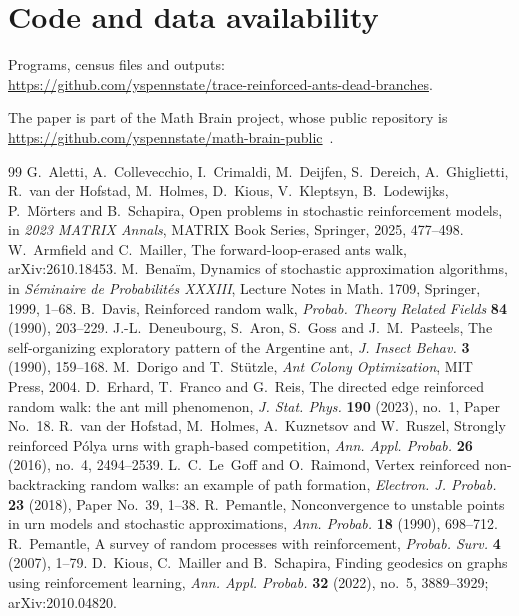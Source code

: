 \documentclass[11pt]{amsart}
\theoremstyle{remark}
\begin{document}
\section*{Code and data availability}
Programs, census files and outputs:\\
\url{https://github.com/yspennstate/trace-reinforced-ants-dead-branches}.

The paper is part of the Math Brain project, whose public repository is
\url{https://github.com/yspennstate/math-brain-public}~\cite{MathBrainRepo}.

\begin{thebibliography}{99}
 G.~Aletti, A.~Collevecchio, I.~Crimaldi, M.~Deijfen, S.~Dereich, A.~Ghiglietti, R.~van der Hofstad,
M.~Holmes, D.~Kious, V.~Kleptsyn, B.~Lodewijks, P.~M\"orters and B.~Schapira, Open problems in stochastic
reinforcement models, in \emph{2023 MATRIX Annals}, MATRIX Book Series, Springer, 2025, 477--498.
 W.~Armfield and C.~Mailler, The forward-loop-erased ants walk, arXiv:2610.18453.
 M.~Bena\"im, Dynamics of stochastic approximation algorithms, in \emph{S\'eminaire de Probabilit\'es
XXXIII}, Lecture Notes in Math. 1709, Springer, 1999, 1--68.
 B.~Davis, Reinforced random walk, \emph{Probab. Theory Related Fields} \textbf{84} (1990), 203--229.
 J.-L.~Deneubourg, S.~Aron, S.~Goss and J.~M.~Pasteels, The self-organizing exploratory pattern of the
Argentine ant, \emph{J. Insect Behav.} \textbf{3} (1990), 159--168.
 M.~Dorigo and T.~St\"utzle, \emph{Ant Colony Optimization}, MIT Press, 2004.
 D.~Erhard, T.~Franco and G.~Reis, The directed edge reinforced random walk: the ant mill phenomenon,
\emph{J. Stat. Phys.} \textbf{190} (2023), no.~1, Paper No.~18.
 R.~van der Hofstad, M.~Holmes, A.~Kuznetsov and W.~Ruszel, Strongly reinforced P\'olya urns with
graph-based competition, \emph{Ann. Appl. Probab.} \textbf{26} (2016), no.~4, 2494--2539.
 L.~C.~Le~Goff and O.~Raimond, Vertex reinforced non-backtracking random walks: an example of path
formation, \emph{Electron. J. Probab.} \textbf{23} (2018), Paper No.~39, 1--38.
 R.~Pemantle, Nonconvergence to unstable points in urn models and stochastic approximations,
\emph{Ann. Probab.} \textbf{18} (1990), 698--712.
 R.~Pemantle, A survey of random processes with reinforcement, \emph{Probab. Surv.} \textbf{4}
(2007), 1--79.
 D.~Kious, C.~Mailler and B.~Schapira, Finding geodesics on graphs using reinforcement learning,
\emph{Ann. Appl. Probab.} \textbf{32} (2022), no.~5, 3889--3929; arXiv:2010.04820.

\end{thebibliography}
\end{document}
